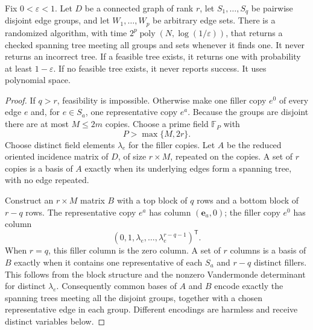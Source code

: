 \begin{lemma}
\label{lem:tree-cover-sieve}
Fix $0<\varepsilon<1$.  Let $D$ be a connected graph of rank $r$, let
$S_1,\ldots,S_q$ be pairwise
disjoint edge groups, and let $W_1,\ldots,W_p$ be arbitrary edge sets.
There is a randomized algorithm, with time
$2^p\operatorname{poly}(N,\log(1/\varepsilon))$, that returns a checked
spanning tree meeting all groups and sets whenever it finds one.
It never returns an incorrect tree.  If a feasible tree exists, it returns
one with probability at least $1-\varepsilon$.  If no feasible tree exists,
it never reports success.  It uses polynomial space.
\end{lemma}
\begin{proof}
If $q>r$, feasibility is impossible.  Otherwise make one filler copy $e^0$
of every edge $e$ and, for $e\in S_a$, one representative copy $e^a$.
Because the groups are disjoint there are at most $M\leq2m$ copies.
Choose a prime field $\mathbb F_P$ with
\[
             P>\max\{M,2r\}.
\]
Choose distinct field elements $\lambda_e$ for the filler copies.  Let
$A$ be the reduced oriented incidence matrix of $D$, of size $r\times M$,
repeated on the copies.  A set of $r$ copies is a basis of $A$ exactly
when its underlying edges form a spanning tree, with no edge repeated.

Construct an $r\times M$ matrix $B$ with a top block of $q$ rows and a
bottom block of $r-q$ rows.  The representative copy $e^a$ has column
$(\mathbf e_a,0)$; the filler copy $e^0$ has column
\[
           (0,1,\lambda_e,\ldots,\lambda_e^{r-q-1})^{\mathsf T}.
\]
When $r=q$, this filler column is the zero column.  A set of $r$ columns
is a basis of $B$ exactly when it contains one representative of each
$S_a$ and $r-q$ distinct fillers.  This follows from the block structure
and the nonzero Vandermonde determinant for distinct $\lambda_e$.
Consequently common bases of $A$ and $B$ encode exactly the spanning trees
meeting all the disjoint groups, together with a chosen representative
edge in each group.  Different encodings are harmless and receive distinct
variables below.


\end{proof}
